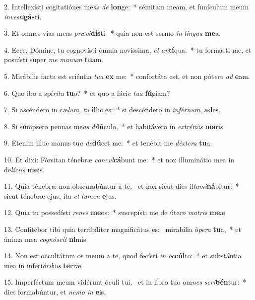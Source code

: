 2. Intellexísti cogitatiónes me\textit{as} \textit{de} \textbf{lon}ge:~*  sémitam meam, et funículum meum \textit{in}\textit{ves}\textit{ti}\textbf{gás}ti.\

3. Et omnes vias meas \textit{præ}\textit{vi}\textbf{dís}ti:~*  quia non est sermo \textit{in} \textit{lin}\textit{gua} \textbf{me}a.\

4. Ecce, Dómine, tu cognovísti ómnia novíssima, \textit{et} \textit{an}\textbf{tí}qua:~*  tu formásti me, et posuísti super \textit{me} \textit{ma}\textit{num} \textbf{tu}am.\

5. Mirábilis facta est sciéntia \textit{tu}\textit{a} \textbf{ex} me:~*  confortáta est, et non pót\textit{e}\textit{ro} \textit{ad} \textbf{e}am.\

6. Quo ibo a spí\textit{ri}\textit{tu} \textbf{tu}o?~*  et quo a fáci\textit{e} \textit{tu}\textit{a} \textbf{fú}giam?\

7. Si ascéndero in cæ\textit{lum}, \textit{tu} \textbf{il}lic es:~*  si descéndero in \textit{in}\textit{fér}\textit{num}, \textbf{ad}es.\

8. Si súmpsero pennas me\textit{as} \textit{di}\textbf{lú}culo,~*  et habitávero in \textit{ex}\textit{tré}\textit{mis} \textbf{ma}ris.\

9. Etenim illuc manus tu\textit{a} \textit{de}\textbf{dú}cet me:~*  et tenébit me \textit{déx}\textit{te}\textit{ra} \textbf{tu}a.\

10. Et dixi: Fórsitan ténebræ \textit{con}\textit{cul}\textbf{cá}bunt me:~*  et nox illuminátio mea in de\textit{lí}\textit{ci}\textit{is} \textbf{me}is.\

11. Quia ténebræ non obscurabúntur a te, \dag\  et nox sicut dies il\textit{lu}\textit{mi}\textbf{ná}bitur:~*  sicut ténebræ ejus, ita \textit{et} \textit{lu}\textit{men} \textbf{e}jus.\

12. Quia tu possedísti \textit{re}\textit{nes} \textbf{me}os:~*  suscepísti me de úte\textit{ro} \textit{ma}\textit{tris} \textbf{me}æ.\

13. Confitébor tibi quia terribíliter magnificátus es: \dag\  mirabília ó\textit{pe}\textit{ra} \textbf{tu}a,~*  et ánima mea \textit{co}\textit{gnó}\textit{scit} \textbf{ni}mis.\

14. Non est occultátum os meum a te, quod fecísti \textit{in} \textit{oc}\textbf{cúl}to:~*  et substántia mea in inferi\textit{ó}\textit{ri}\textit{bus} \textbf{ter}ræ.\

15. Imperféctum meum vidérunt óculi tui, \dag\  et in libro tuo om\textit{nes} \textit{scri}\textbf{bén}tur:~*  dies formabúntur, et \textit{ne}\textit{mo} \textit{in} \textbf{e}is.\

